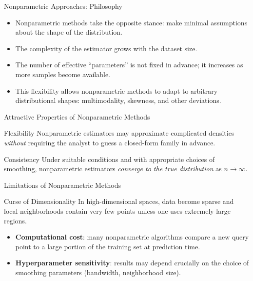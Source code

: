 \begin{frame}{Nonparametric Approaches: Philosophy}
  \begin{itemize}
    \item Nonparametric methods take the \alert{opposite stance}: make minimal assumptions about the shape of the distribution.
    \item The complexity of the estimator \alert{grows with the dataset size}.
    \item The number of effective ``parameters'' is not fixed in advance; it increases as more samples become available.
    \item This flexibility allows nonparametric methods to adapt to \alert{arbitrary distributional shapes}: multimodality, skewness, and other deviations.
  \end{itemize}
\end{frame}

\begin{frame}{Attractive Properties of Nonparametric Methods}
  \begin{block}{Flexibility}
    Nonparametric estimators may approximate complicated densities \emph{without} requiring the analyst to guess a closed-form family in advance.
  \end{block}
  \vspace{0.5em}
  \begin{block}{Consistency}
    Under suitable conditions and with appropriate choices of smoothing, nonparametric estimators \emph{converge to the true distribution} as $n \to \infty$.
  \end{block}
\end{frame}

\begin{frame}{Limitations of Nonparametric Methods}
  \begin{alertblock}{Curse of Dimensionality}
    In high-dimensional spaces, data become sparse and local neighborhoods contain very few points unless one uses extremely large regions.
  \end{alertblock}
  \vspace{0.4em}
  \begin{itemize}
    \item \textbf{Computational cost}: many nonparametric algorithms compare a new query point to a large portion of the training set at prediction time.
    \item \textbf{Hyperparameter sensitivity}: results may depend crucially on the choice of smoothing parameters (bandwidth, neighborhood size).
  \end{itemize}
\end{frame}

